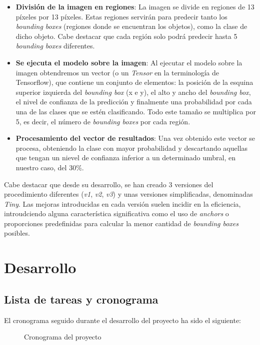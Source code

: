 \documentclass[a4paper]{article}
\begin{document}
\begin{itemize}
    \item \textbf{División de la imagen en regiones}: La imagen se divide en regiones de 13 píxeles 
    por 13 píxeles. Estas regiones servirán para predecir tanto los \textit{bounding boxes} (regiones
    donde se encuentran los objetos), como la clase de dicho objeto. Cabe destacar que cada región 
    solo podrá predecir hasta 5 \textit{bounding boxes} diferentes.
    \item \textbf{Se ejecuta el modelo sobre la imagen}: Al ejecutar el modelo sobre la imagen 
    obtendremos un vector (o un \textit{Tensor} en la terminología de Tensorflow), que contiene un 
    conjunto de elementos: la posición de la esquina superior izquierda del \textit{bounding box} (x e
    y), el alto y ancho del \textit{bounding box}, el nivel de confianza de la predicción y finalmente
    una probabilidad por cada una de las clases que se estén clasificando. Todo este tamaño se
    multiplica por 5, es decir, el número de \textit{bounding boxes}
    por cada región.
    \item \textbf{Procesamiento del vector de resultados}: Una vez obtenido este vector se procesa,
    obteniendo la clase con mayor probabilidad y descartando aquellas que tengan un nievel de 
    confianza inferior a un determinado umbral, en nuestro caso, del 30\%.
\end{itemize}

Cabe destacar que desde su desarrollo, se han creado 3 versiones del procedimiento diferentes 
(\textit{v1}, \textit{v2}, \textit{v3}) y unas versiones simplificadas, denominadas
\textit{Tiny}. Las mejoras introducidas en cada versión suelen incidir en la eficiencia,
introudciendo alguna característica significativa como el uso de \textit{anchors} o proporciones 
predefinidas para calcular la menor cantidad de \textit{bounding boxes} posibles.

\section{Desarrollo}
\subsection{Lista de tareas y cronograma}
El cronograma seguido durante el desarrollo del proyecto ha sido el siguiente:

\begin{figure}[ht]
    \noindent{}
   \caption{Cronograma del proyecto}
\end{figure}
\end{document}
